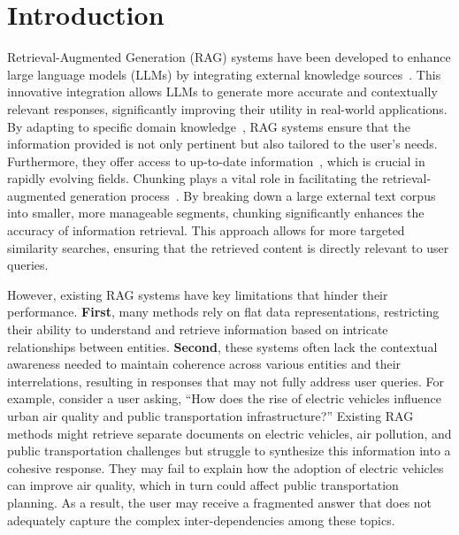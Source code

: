 \section{Introduction}
\label{sec:intro}

Retrieval-Augmented Generation (RAG) systems have been developed to enhance large language models (LLMs) by integrating external knowledge sources~\cite{sudhi2024rag, es2024ragas, salemi2024evaluating}. This innovative integration allows LLMs to generate more accurate and contextually relevant responses, significantly improving their utility in real-world applications. By adapting to specific domain knowledge~\cite{tu2024r}, RAG systems ensure that the information provided is not only pertinent but also tailored to the user's needs. Furthermore, they offer access to up-to-date information~\cite{zhao2024retrieval}, which is crucial in rapidly evolving fields. Chunking plays a vital role in facilitating the retrieval-augmented generation process~\cite{lyu2024crud}. By breaking down a large external text corpus into smaller, more manageable segments, chunking significantly enhances the accuracy of information retrieval. This approach allows for more targeted similarity searches, ensuring that the retrieved content is directly relevant to user queries.

However, existing RAG systems have key limitations that hinder their performance. \textbf{First}, many methods rely on flat data representations, restricting their ability to understand and retrieve information based on intricate relationships between entities. \textbf{Second}, these systems often lack the contextual awareness needed to maintain coherence across various entities and their interrelations, resulting in responses that may not fully address user queries. For example, consider a user asking, ``How does the rise of electric vehicles influence urban air quality and public transportation infrastructure?'' Existing RAG methods might retrieve separate documents on electric vehicles, air pollution, and public transportation challenges but struggle to synthesize this information into a cohesive response. They may fail to explain how the adoption of electric vehicles can improve air quality, which in turn could affect public transportation planning. As a result, the user may receive a fragmented answer that does not adequately capture the complex inter-dependencies among these topics.

